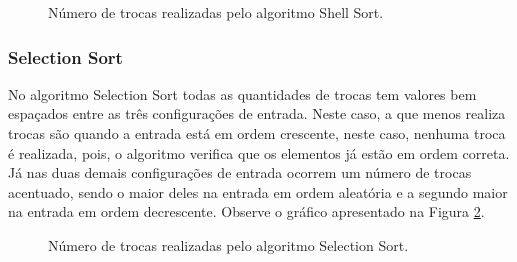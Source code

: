 \documentclass[conference,onecolumn]{IEEEtran}
\begin{document}
\begin{figure}[H]
\begin{center}
\end{center}
\caption{Número de trocas realizadas pelo algoritmo Shell Sort.}
\label{graf:shell-troca}
\end{figure}

\subsubsection{Selection Sort}

No algoritmo Selection Sort todas as quantidades de trocas tem valores bem espaçados entre as três configurações de entrada. Neste caso, a que menos realiza trocas são quando a entrada está em ordem crescente, neste caso, nenhuma troca é realizada, pois, o algoritmo verifica que os elementos já estão em ordem correta. Já nas duas demais configurações de entrada ocorrem um número de trocas acentuado, sendo o maior deles na entrada em ordem aleatória e a segundo maior na entrada em ordem decrescente. Observe o gráfico apresentado na Figura \ref{graf:selection-troca}.

\begin{figure}[H]
\begin{center}
\end{center}
\caption{Número de trocas realizadas pelo algoritmo Selection Sort.}
\label{graf:selection-troca}
\end{figure}
\end{document}
